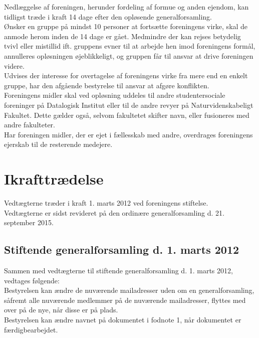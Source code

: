 \documentclass[a4paper,11pt,danish]{article}
\begin{document}
\noindent Nedlæggelse af foreningen, herunder fordeling af formue og anden
ejendom, kan tidligst træde i kraft 14 dage efter den opløsende
generalforsamling.\\

\noindent Ønsker en gruppe på mindst 10 personer at fortsætte foreningens
virke, skal de anmode herom inden de 14 dage er gået. Medmindre der kan rejses
betydelig tvivl eller mistillid ift. gruppens evner til at arbejde hen imod
foreningens formål, annulleres opløsningen øjeblikkeligt, og gruppen får til
ansvar at drive foreningen videre.\\

\noindent Udvises der interesse for overtagelse af foreningens virke fra mere
end en enkelt gruppe, har den afgående bestyrelse til ansvar at afgøre
konflikten.\\

\noindent Foreningens midler skal ved opløsning uddeles til andre
studentersociale foreninger på Datalogisk Institut eller til de andre revyer
på Naturvidenskabeligt Fakultet. Dette gælder også, selvom fakultetet skifter
navn, eller fusioneres med andre fakulteter. \\

\noindent Har foreningen midler, der er ejet i fællesskab med andre, overdrages
foreningens ejerskab til de resterende medejere. 

\section{Ikrafttrædelse}
Vedtægterne træder i kraft 1. marts 2012 ved foreningens stiftelse.\\

\noindent Vedtægterne er sidst revideret på den ordinære generalforsamling d.
21. september 2015.

\newpage

\begin{appendices}

\section{Stiftende generalforsamling d. 1. marts 2012}
\label{app:foundingassembly}

Sammen med vedtægterne til stiftende generalforsamling d. 1. marts 2012,
vedtages følgende:\\

\noindent Bestyrelsen kan ændre de nuværende mailadresser uden om en
generalforsamling, såfremt alle nuværende medlemmer på de nuværende
mailadresser, flyttes med over på de nye, når disse er på plads.\\

\noindent Bestyrelsen kan ændre navnet på dokumentet i fodnote 1, når
dokumentet er færdigbearbejdet.

\end{appendices}
\end{document}
